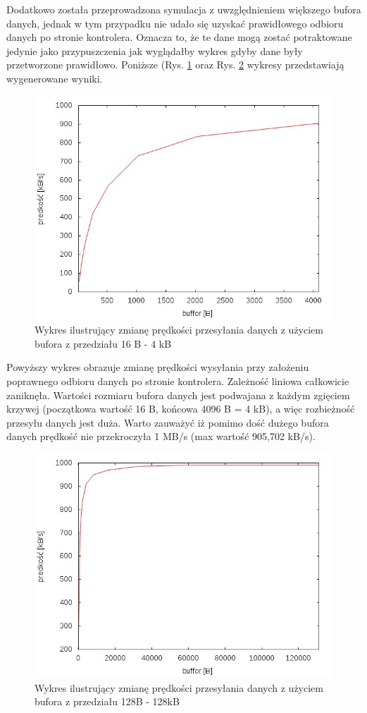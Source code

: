 \documentclass{BscUS}
\begin{document}
\noindent Dodatkowo została przeprowadzona symulacja z uwzględnieniem większego bufora danych, jednak w tym przypadku nie udało się uzyskać prawidłowego odbioru danych  po stronie kontrolera. Oznacza to, że te dane mogą zostać potraktowane jedynie jako przypuszczenia jak wyglądałby wykres gdyby dane były przetworzone prawidłowo. Poniższe (Rys. \ref{fig:S_bbuf1} oraz Rys. \ref{fig:S_bbuf2} wykresy przedstawiają wygenerowane wyniki.

\begin{figure}[H]
{
\centering
\includegraphics[width=1\textwidth]{./img/S_bbuf1}
\caption{Wykres ilustrujący zmianę prędkości przesyłania danych z użyciem bufora z przedziału 16 B - 4 kB}
\label{fig:S_bbuf1}
}
\end{figure}
\noindent Powyższy wykres obrazuje zmianę prędkości wysyłania przy założeniu poprawnego odbioru danych po stronie kontrolera. Zależność liniowa całkowicie zaniknęła. Wartości rozmiaru bufora danych jest podwajana z każdym zgięciem krzywej (początkowa wartość 16 B, końcowa 4096 B = 4 kB), a więc rozbieżność przesyłu danych jest duża. Warto zauważyć iż pomimo dość dużego bufora danych prędkość nie przekroczyła 1 MB/s (max wartość 905,702 kB/s).
\begin{figure}[H]
{
\centering
\includegraphics[width=1\textwidth]{./img/S_bbuf2}
\caption{Wykres ilustrujący zmianę prędkości przesyłania danych z użyciem bufora z przedziału 128B - 128kB}
\label{fig:S_bbuf2}
}
\end{figure}
\end{document}
